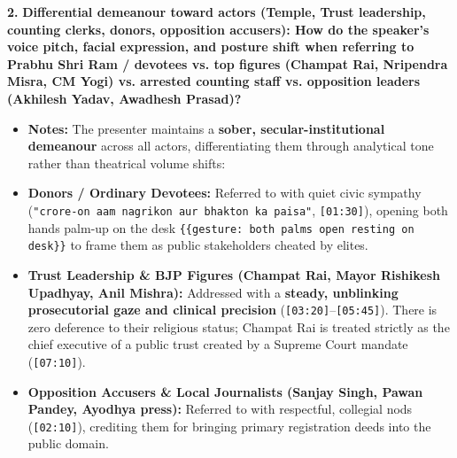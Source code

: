\documentclass[10pt,a4paper]{article}
\begin{document}
\noindent\textbf{2.} \textbf{Differential demeanour toward actors (Temple, Trust leadership, counting clerks, donors, opposition accusers): How do the speaker's voice pitch, facial expression, and posture shift when referring to Prabhu Shri Ram / devotees vs. top figures (Champat Rai, Nripendra Misra, CM Yogi) vs. arrested counting staff vs. opposition leaders (Akhilesh Yadav, Awadhesh Prasad)?}\par\smallskip
\begin{itemize}
  \item \textbf{Notes:}
The presenter maintains a \textbf{sober, secular-institutional demeanour} across all actors, differentiating them through analytical tone rather than theatrical volume shifts:\par\smallskip
  \item \textbf{Donors / Ordinary Devotees:} Referred to with quiet civic sympathy (\texttt{"crore-on aam nagrikon aur bhakton ka paisa"}, \texttt{[01:30]}), opening both hands palm-up on the desk \texttt{\{\{gesture: both palms open resting on desk\}\}} to frame them as public stakeholders cheated by elites.
  \item \textbf{Trust Leadership \& BJP Figures (Champat Rai, Mayor Rishikesh Upadhyay, Anil Mishra):} Addressed with a \textbf{steady, unblinking prosecutorial gaze and clinical precision} (\texttt{[03:20]}--\texttt{[05:45]}). There is zero deference to their religious status; Champat Rai is treated strictly as the chief executive of a public trust created by a Supreme Court mandate (\texttt{[07:10]}).
  \item \textbf{Opposition Accusers \& Local Journalists (Sanjay Singh, Pawan Pandey, Ayodhya press):} Referred to with respectful, collegial nods (\texttt{[02:10]}), crediting them for bringing primary registration deeds into the public domain.
\end{itemize}
\end{document}
